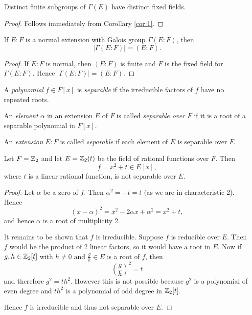 \begin{corollary}\label{cor:2}
	Distinct finite subgroups of $\Gamma(E)$ have distinct fixed fields.
	\begin{proof}
		Follows immediately from Corollary \ref{cor:1}.
	\end{proof}
\end{corollary}

\begin{corollary}\label{cor:3}
	If $E : F$ is a normal extension with Galois group $\Gamma(E : F)$, then
	\[
		|\Gamma(E : F)| = (E : F).
	\]
	\begin{proof}
		If $E : F$ is normal, then $(E : F)$ is finite and $F$ is the fixed field for $\Gamma(E : F)$. Hence $|\Gamma(E : F)| = (E : F)$.
	\end{proof}
\end{corollary}

\begin{definition}
	A \emph{polynomial} $f \in F[x]$ is \emph{separable} if the irreducible factors of $f$ have no repeated roots.
	
	An \emph{element} $\alpha$ in an extension $E$ of $F$ is called \emph{separable over $F$} if it is a root of a separable polynomial in $F[x]$.
	
	An \emph{extension} $E : F$ is called \emph{separable} if each element of $E$ is separable over $F$.
\end{definition}

\begin{example}
	Let $F = \mathbb{Z}_2$ and let $E = \mathbb{Z}_2(t)$ be the field of rational functions over $F$. Then
	\[
		f = x^2 + t \in E[x],
	\]
	where $t$ is a linear rational function, is not separable over $E$.
	\begin{proof}
		Let $\alpha$ be a zero of $f$. Then $\alpha^2 = -t = t$ (as we are in characteristic 2). Hence
		\[
			(x - \alpha)^2 = x^2 - 2\alpha x + \alpha^2 = x^2 + t,
		\]
		and hence $\alpha$ is a root of multiplicity 2.
		
		It remains to be shown that $f$ is irreducible. Suppose $f$ is reducible over $E$. Then $f$ would be the product of 2 linear factors, so it would have a root in $E$. Now if $g, h \in \mathbb{Z}_2[t]$ with $h \neq 0$ and $\frac{g}{h} \in E$ is a root of $f$, then
		\[
			\left(\frac{g}{h}\right)^2 = t
		\]
		and therefore $g^2 = th^2$. However this is not possible because $g^2$ is a polynomial of even degree and $th^2$ is a polynomial of odd degree in $\mathbb{Z}_2[t]$.
		
		Hence $f$ is irreducible and thus not separable over $E$.
	\end{proof}
\end{example}

